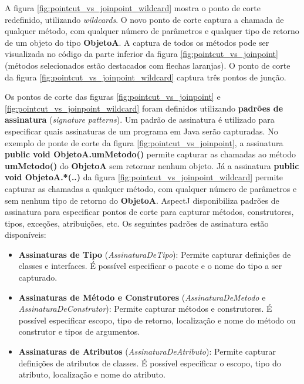 A figura \ref{fig:pointcut_vs_joinpoint_wildcard} mostra o ponto de corte redefinido, utilizando \textit{wildcards}. 
O novo ponto de corte captura a chamada de qualquer método, com qualquer número
de parâmetros e qualquer tipo de retorno de um objeto do tipo \textbf{ObjetoA}.
A captura de todos os métodos pode ser visualizada no código da parte inferior
da figura \ref{fig:pointcut_vs_joinpoint} (métodos selecionados estão destacados
com flechas laranjas). O ponto de corte da figura \ref{fig:pointcut_vs_joinpoint_wildcard} captura três pontos de junção.

Os pontos de corte das figuras \ref{fig:pointcut_vs_joinpoint} e \ref{fig:pointcut_vs_joinpoint_wildcard} foram definidos utilizando \textbf{padrões
de assinatura} (\textit{signature patterns}). Um padrão de assinatura é utilizado para especificar quais assinaturas de um programa em Java serão capturadas. No
exemplo de ponte de corte da figura \ref{fig:pointcut_vs_joinpoint}, a assinatura \textbf{public void ObjetoA.umMetodo()} permite capturar as chamadas
ao método \textbf{umMetodo()} do \textbf{ObjetoA} sem retornar nenhum objeto. Já a assinatura \textbf{public void ObjetoA.*(..)} da 
figura \ref{fig:pointcut_vs_joinpoint_wildcard} permite capturar as chamadas a qualquer método, com qualquer número de parâmetros e sem nenhum
tipo de retorno do \textbf{ObjetoA}. AspectJ disponibiliza padrões de assinatura para especificar pontos de corte para capturar métodos, construtores,
tipos, exceções, atribuições, etc. Os seguintes padrões de assinatura estão disponíveis:

\begin{itemize}
  \item \textbf{Assinaturas de Tipo} (\textit{AssinaturaDeTipo}): Permite
  capturar definições de classes e interfaces. É possível especificar o pacote e o nome
  do tipo a ser capturado.
  \item \textbf{Assinaturas de Método e Construtores}
  (\textit{AssinaturaDeMetodo} e \textit{AssinaturaDeConstrutor}): Permite
  capturar métodos e construtores. É possível especificar escopo, tipo de retorno, localização e nome do método
  ou construtor e tipos de argumentos.
  \item \textbf{Assinaturas de Atributos} (\textit{AssinaturaDeAtributo}):
  Permite capturar definições de atributos de classes. É possível especificar o escopo, tipo do
  atributo, localização e nome do atributo.
\end{itemize}

